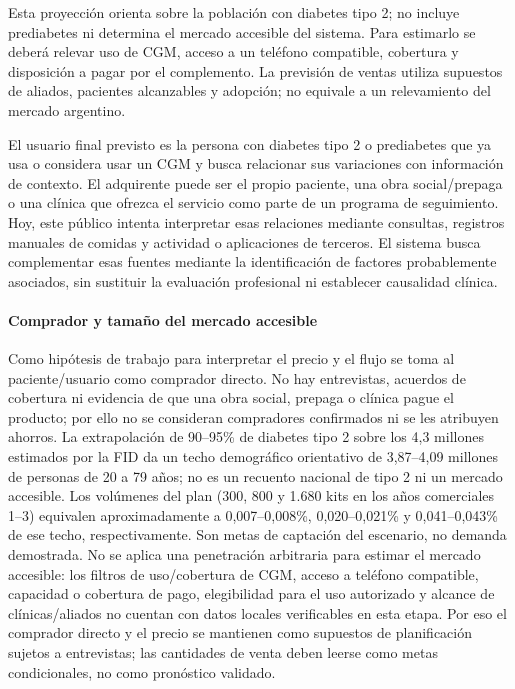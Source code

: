 Esta proyección orienta sobre la población con diabetes tipo 2; no incluye prediabetes ni determina el mercado accesible del sistema. Para estimarlo se deberá relevar uso de CGM, acceso a un teléfono compatible, cobertura y disposición a pagar por el complemento. La previsión de ventas utiliza supuestos de aliados, pacientes alcanzables y adopción; no equivale a un relevamiento del mercado argentino.

El usuario final previsto es la persona con diabetes tipo 2 o prediabetes que ya usa o considera usar un CGM y busca relacionar sus variaciones con información de contexto. El adquirente puede ser el propio paciente, una obra social/prepaga o una clínica que ofrezca el servicio como parte de un programa de seguimiento. Hoy, este público intenta interpretar esas relaciones mediante consultas, registros manuales de comidas y actividad o aplicaciones de terceros. El sistema busca complementar esas fuentes mediante la identificación de factores probablemente asociados, sin sustituir la evaluación profesional ni establecer causalidad clínica.

\paragraph{Comprador y tamaño del mercado accesible}
Como hipótesis de trabajo para interpretar el precio y el flujo se toma al paciente/usuario como comprador directo. No hay entrevistas, acuerdos de cobertura ni evidencia de que una obra social, prepaga o clínica pague el producto; por ello no se consideran compradores confirmados ni se les atribuyen ahorros. La extrapolación de 90--95\% de diabetes tipo 2 sobre los 4,3 millones estimados por la FID da un techo demográfico orientativo de 3,87--4,09 millones de personas de 20 a 79 años; no es un recuento nacional de tipo 2 ni un mercado accesible. Los volúmenes del plan (300, 800 y 1.680 kits en los años comerciales 1--3) equivalen aproximadamente a 0,007--0,008\%, 0,020--0,021\% y 0,041--0,043\% de ese techo, respectivamente. Son metas de captación del escenario, no demanda demostrada. No se aplica una penetración arbitraria para estimar el mercado accesible: los filtros de uso/cobertura de CGM, acceso a teléfono compatible, capacidad o cobertura de pago, elegibilidad para el uso autorizado y alcance de clínicas/aliados no cuentan con datos locales verificables en esta etapa. Por eso el comprador directo y el precio se mantienen como supuestos de planificación sujetos a entrevistas; las cantidades de venta deben leerse como metas condicionales, no como pronóstico validado.

